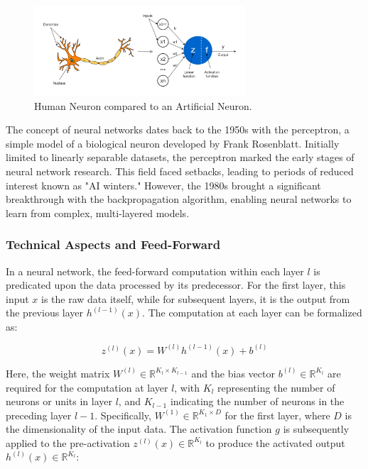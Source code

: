 \begin{figure}[htb!]
\centering
\includegraphics[width=0.7\textwidth]{Images/HumanNeuronVsArtificialNeuron.png}
\caption{Human Neuron compared to an Artificial Neuron.}
\label{Figure:HumanNeuronVsArtificialNeuron}
\end{figure}

The concept of neural networks dates back to the 1950s with the perceptron, a simple model of a biological neuron developed by Frank Rosenblatt. Initially limited to linearly separable datasets, the perceptron marked the early stages of neural network research. This field faced setbacks, leading to periods of reduced interest known as "AI winters." However, the 1980s brought a significant breakthrough with the backpropagation algorithm, enabling neural networks to learn from complex, multi-layered models.

\subsubsection{Technical Aspects and Feed-Forward}
In a neural network, the feed-forward computation within each layer \( l \) is predicated upon the data processed by its predecessor. For the first layer, this input \( x \) is the raw data itself, while for subsequent layers, it is the output from the previous layer \( h^{(l-1)}(x) \). The computation at each layer can be formalized as:

\begin{equation}
z^{(l)}(x) = W^{(l)} h^{(l-1)}(x) + b^{(l)}
\end{equation}

Here, the weight matrix \( W^{(l)} \in \mathbb{R}^{K_l \times K_{l-1}} \) and the bias vector \( b^{(l)} \in \mathbb{R}^{K_l} \) are required for the computation at layer \( l \), with \( K_l \) representing the number of neurons or units in layer \( l \), and \( K_{l-1} \) indicating the number of neurons in the preceding layer \( l-1 \). Specifically, \( W^{(1)} \in \mathbb{R}^{K_1 \times D} \) for the first layer, where \( D \) is the dimensionality of the input data. The activation function \( g \) is subsequently applied to the pre-activation \( z^{(l)}(x) \in \mathbb{R}^{K_l} \) to produce the activated output \( h^{(l)}(x) \in \mathbb{R}^{K_l} \):

